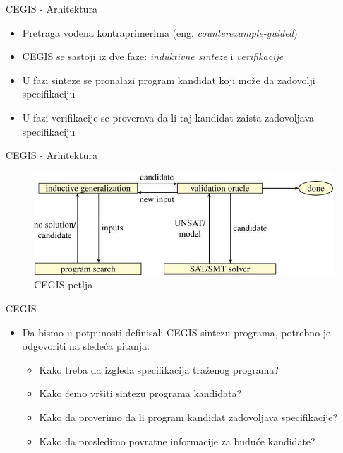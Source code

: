 \documentclass{beamer}
\begin{document}
\begin{frame}{CEGIS - Arhitektura}
    \begin{itemize}
        \item Pretraga vođena kontraprimerima (eng. \emph{counterexample-guided})
        \item CEGIS se sastoji iz dve faze: \emph{induktivne sinteze} i \emph{verifikacije}
        \item U fazi sinteze se pronalazi program kandidat koji može da zadovolji specifikaciju
        \item U fazi verifikacije se proverava da li taj kandidat zaista zadovoljava specifikaciju
    \end{itemize}
\end{frame}

\begin{frame}[fragile]{CEGIS - Arhitektura}
    \begin{figure}
        \begin{center}
            \includegraphics[scale=0.4]{../resources/cegis.jpeg}
        \end{center}
        \caption{CEGIS petlja}
    \end{figure}
\end{frame}

\begin{frame}{CEGIS}
    \begin{itemize}
        \item Da bismo u potpunosti definisali CEGIS sintezu programa, potrebno je odgovoriti na sledeća pitanja:
        \begin{itemize}
            \item Kako treba da izgleda specifikacija traženog programa?
            \item Kako ćemo vršiti sintezu programa kandidata?
            \item Kako da proverimo da li program kandidat zadovoljava specifikacije?
            \item Kako da prosledimo povratne informacije za buduće kandidate?
        \end{itemize}
    \end{itemize}
\end{frame}
\end{document}
